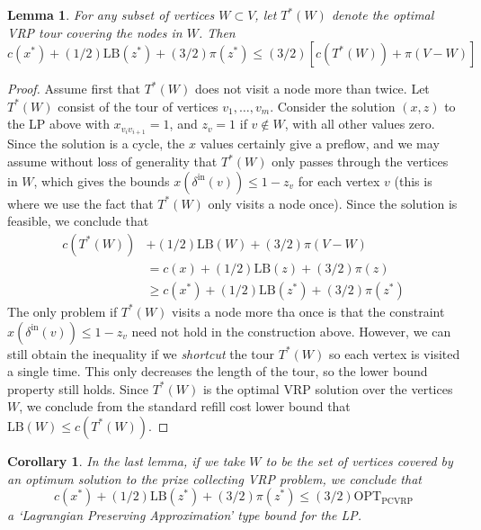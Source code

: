 \documentclass{article}
\theoremstyle{plain}
\newtheorem{lemma}{Lemma}
\newtheorem*{corollary}{Corollary}
\theoremstyle{plain}
\begin{document}
\begin{lemma}\label{thm:VRPTourBound}
    For any subset of vertices $W \subset V$, let $T^*(W)$ denote the optimal VRP tour covering the nodes in $W$. Then
    \[ c(x^*) + (1/2)\text{LB}(z^*) + (3/2) \pi(z^*) \leq (3/2)[c(T^*(W)) + \pi(V-W)] \]
\end{lemma}
\begin{proof}
    Assume first that $T^*(W)$ does not visit a node more than twice. Let $T^*(W)$ consist of the tour of vertices $v_1, \dots, v_m$. Consider the solution $(x,z)$ to the LP above with $x_{v_i v_{i+1}} = 1$, and $z_v = 1$ if $v \not \in W$, with all other values zero. Since the solution is a cycle, the $x$ values certainly give a preflow, and we may assume without loss of generality that $T^*(W)$ only passes through the vertices in $W$, which gives the bounds $x(\delta^{\text{in}}(v)) \leq 1 - z_v$ for each vertex $v$ (this is where we use the fact that $T^*(W)$ only visits a node once). Since the solution is feasible, we conclude that
    \begin{align*}
        c(T^*(W)) &+ (1/2) \text{LB}(W) + (3/2) \pi(V-W)\\
        &= c(x) + (1/2) \text{LB}(z) + (3/2) \pi(z)\\
        &\geq c(x^*) + (1/2) \text{LB}(z^*) + (3/2) \pi(z^*)
    \end{align*}
    The only problem if $T^*(W)$ visits a node more tha once is that the constraint $x(\delta^{\text{in}}(v)) \leq 1 - z_v$ need not hold in the construction above. However, we can still obtain the inequality if we {\it shortcut} the tour $T^*(W)$ so each vertex is visited a single time. This only decreases the length of the tour, so the lower bound property still holds. Since $T^*(W)$ is the optimal VRP solution over the vertices $W$, we conclude from the standard refill cost lower bound that $\text{LB}(W) \leq c(T^*(W))$.
\end{proof}

\begin{corollary}
    In the last lemma, if we take $W$ to be the set of vertices covered by an optimum solution to the prize collecting VRP problem, we conclude that
    \[ c(x^*) + (1/2) \text{LB}(z^*) + (3/2) \pi(z^*) \leq (3/2) \text{OPT}_{\text{PCVRP}} \]
    a `Lagrangian Preserving Approximation' type bound for the LP.
\end{corollary}
\end{document}
